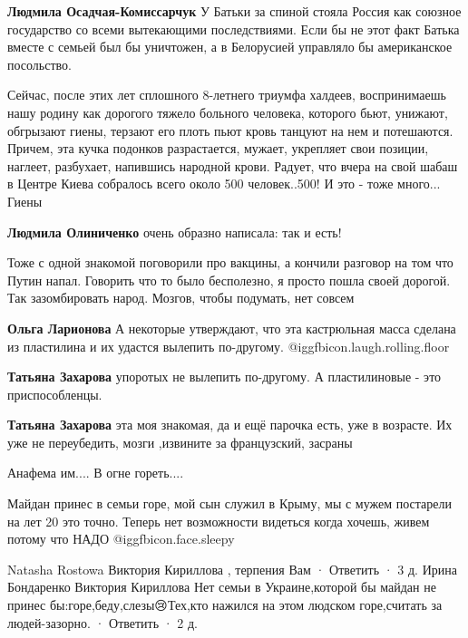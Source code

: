 \begin{itemize}
\begin{itemize}
\textbf{Людмила Осадчая-Комиссарчук} У Батьки за спиной стояла Россия как союзное государство со всеми вытекающими последствиями. Если бы не этот факт Батька вместе с семьей был бы уничтожен, а в Белорусией управляло бы американское посольство.


Сейчас, после этих лет сплошного 8-летнего триумфа халдеев, воспринимаешь нашу
родину как дорогого тяжело больного человека, которого бьют, унижают, обгрызают
гиены, терзают его плоть пьют кровь танцуют на нем и потешаются. Причем, эта
кучка подонков разрастается, мужает, укрепляет свои позиции, наглеет,
разбухает, напившись народной крови. Радует, что вчера на свой шабаш в Центре
Киева собралось всего около 500 человек..500! И это - тоже много... Гиены

\textbf{Людмила Олиниченко} очень образно написала: так и есть!

\end{itemize} %


Тоже с одной знакомой поговорили про вакцины, а кончили разговор на том что
Путин напал. Говорить что то было бесполезно, я просто пошла своей дорогой. Так
зазомбировать народ. Мозгов, чтобы подумать, нет совсем

\begin{itemize} %
\textbf{Ольга Ларионова} А некоторые утверждают, что эта кастрюльная масса сделана из пластилина и их удастся вылепить по-другому. @igg{fbicon.laugh.rolling.floor} 


\textbf{Татьяна Захарова} упоротых не вылепить по-другому. А пластилиновые - это приспособленцы.

\textbf{Татьяна Захарова} эта моя знакомая, да и ещё парочка есть, уже в возрасте. Их уже не переубедить, мозги ,извините за французский, засраны
\end{itemize} %

Анафема им....
В огне гореть....


Майдан принес в семьи горе, мой сын служил в Крыму, мы с мужем постарели на лет
20 это точно. Теперь нет возможности видеться когда хочешь, живем потому что
НАДО @igg{fbicon.face.sleepy} 

\begin{itemize} %
Natasha Rostowa
Виктория Кириллова , терпения Вам
 · Ответить · 3 д.
Ирина Бондаренко
Виктория Кириллова Нет семьи в Украине,которой бы майдан не принес бы:горе,беду,слезы😢Тех,кто нажился на этом людском горе,считать за людей-зазорно.
 · Ответить · 2 д.


\end{itemize}
\end{itemize}
